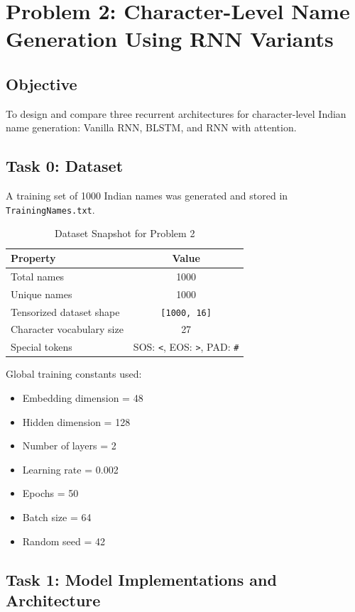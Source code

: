 \documentclass[11pt,a4paper]{article}
\begin{document}
\section{Problem 2: Character-Level Name Generation Using RNN Variants}

\subsection{Objective}
To design and compare three recurrent architectures for character-level Indian name generation: Vanilla RNN, BLSTM, and RNN with attention.

\subsection{Task 0: Dataset}
A training set of 1000 Indian names was generated and stored in \texttt{TrainingNames.txt}.

\begin{table}[H]
\centering
\caption{Dataset Snapshot for Problem 2}
\small
\begin{tabular}{l c}
\toprule
\textbf{Property} & \textbf{Value} \\
\midrule
Total names & 1000 \\
Unique names & 1000 \\
Tensorized dataset shape & \texttt{[1000, 16]} \\
Character vocabulary size & 27 \\
Special tokens & SOS: \texttt{<}, EOS: \texttt{>}, PAD: \texttt{\#} \\
\bottomrule
\end{tabular}
\end{table}

Global training constants used:
\begin{itemize}[leftmargin=1.5em]
    \item Embedding dimension = 48
    \item Hidden dimension = 128
    \item Number of layers = 2 
    \item Learning rate = 0.002
    \item Epochs = 50
    \item Batch size = 64
    \item Random seed = 42
\end{itemize}

\subsection{Task 1: Model Implementations and Architecture}
\end{document}
